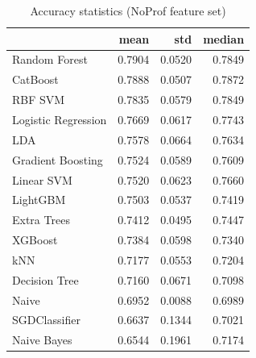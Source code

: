 \begin{table}
\caption{Accuracy statistics (NoProf feature set)}
\label{tab:accuracy_NoProf_stats}
\begin{tabular}{lrrr}
\toprule
 & mean & std & median \\
\midrule
Random Forest & 0.7904 & 0.0520 & 0.7849 \\
CatBoost & 0.7888 & 0.0507 & 0.7872 \\
RBF SVM & 0.7835 & 0.0579 & 0.7849 \\
Logistic Regression & 0.7669 & 0.0617 & 0.7743 \\
LDA & 0.7578 & 0.0664 & 0.7634 \\
Gradient Boosting & 0.7524 & 0.0589 & 0.7609 \\
Linear SVM & 0.7520 & 0.0623 & 0.7660 \\
LightGBM & 0.7503 & 0.0537 & 0.7419 \\
Extra Trees & 0.7412 & 0.0495 & 0.7447 \\
XGBoost & 0.7384 & 0.0598 & 0.7340 \\
kNN & 0.7177 & 0.0553 & 0.7204 \\
Decision Tree & 0.7160 & 0.0671 & 0.7098 \\
Naive & 0.6952 & 0.0088 & 0.6989 \\
SGDClassifier & 0.6637 & 0.1344 & 0.7021 \\
Naive Bayes & 0.6544 & 0.1961 & 0.7174 \\
\bottomrule
\end{tabular}
\end{table}
